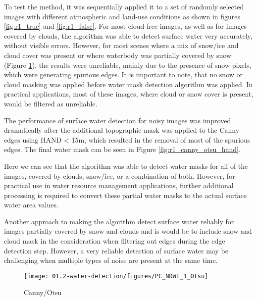 To test the method, it was sequentially applied it to a set of randomly selected images with different atmospheric and land-use conditions as shown in figures \ref{fig:r1_true} and \ref{fig:r1_false}. For most cloud-free images, as well as for images covered by clouds, the algorithm was able to detect surface water very accurately, without visible errors. However, for most scenes where a mix of snow/ice and cloud cover was present or where waterbody was partially covered by snow (Figure \ref{fig:r1_canny_otsu}), the results were unreliable, mainly due to the presence of snow pixels, which were generating spurious edges. It is important to note, that no snow or cloud masking was applied before water mask detection algorithm was applied. In practical applications, most of these images, where cloud or snow cover is present, would be filtered as unreliable.

The performance of surface water detection for noisy images was improved dramatically after the additional topographic mask was applied to the Canny edges using HAND < 15m, which resulted in the removal of most of the spurious edges. The final water mask can be seen in Figure \ref{fig:r1_canny_otsu_hand}.

Here we can see that the algorithm was able to detect water masks for all of the images, covered by clouds, snow/ice, or a combination of both. However, for practical use in water resource management applications, further additional processing is required to convert these partial water masks to the actual surface water area values.

Another approach to making the algorithm detect surface water reliably for images partially covered by snow and clouds and is would be to include snow and cloud mask in the consideration when filtering out edges during the edge detection step. However, a very reliable detection of surface water may be challenging when multiple types of noise are present at the same time.

\begin{comment}
\begin{figure}[H]
	\centering
	\texttt{[image: 01.2-water-detection/figures/PC\_NDWI\_0]}
	\caption{NDWI=0}
	\label{fig:r1_ndwi0}
\end{figure}
\end{comment}

\begin{figure}[H]
	\centering
	\texttt{[image: 01.2-water-detection/figures/PC\_NDWI\_1\_Otsu]}
	\caption{Canny/Otsu}
	\label{fig:r1_canny_otsu}
\end{figure}

